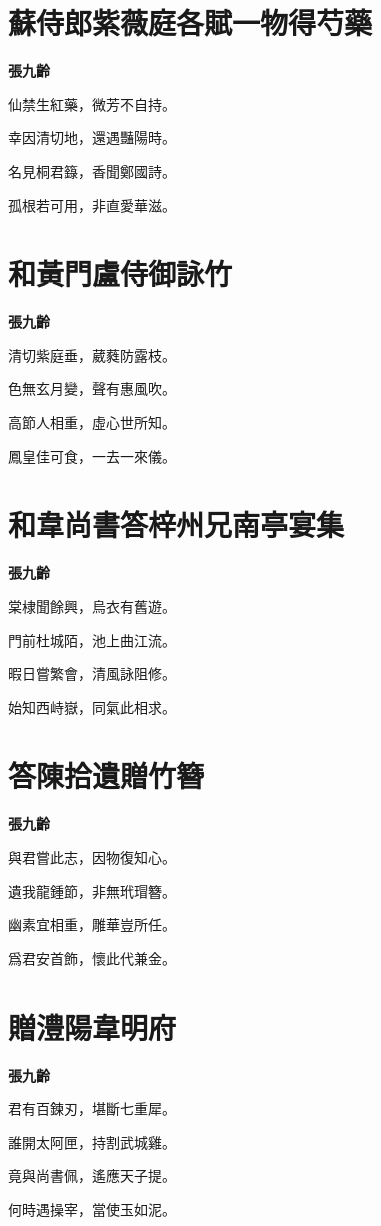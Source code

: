 \documentclass[12pt,a4paper]{ctexbook}
\begin{document}
\section{蘇侍郎紫薇庭各賦一物得芍藥}
\textbf{張九齡}\par\vspace{0.5em}
仙禁生紅藥，微芳不自持。\par
幸因清切地，還遇豔陽時。\par
名見桐君籙，香聞鄭國詩。\par
孤根若可用，非直愛華滋。\par

\section{和黃門盧侍御詠竹}
\textbf{張九齡}\par\vspace{0.5em}
清切紫庭垂，葳蕤防露枝。\par
色無玄月變，聲有惠風吹。\par
高節人相重，虛心世所知。\par
鳳皇佳可食，一去一來儀。\par

\section{和韋尚書答梓州兄南亭宴集}
\textbf{張九齡}\par\vspace{0.5em}
棠棣聞餘興，烏衣有舊遊。\par
門前杜城陌，池上曲江流。\par
暇日嘗繁會，清風詠阻修。\par
始知西峙嶽，同氣此相求。\par

\section{答陳拾遺贈竹簪}
\textbf{張九齡}\par\vspace{0.5em}
與君嘗此志，因物復知心。\par
遺我龍鍾節，非無玳瑁簪。\par
幽素宜相重，雕華豈所任。\par
爲君安首飾，懷此代兼金。\par

\section{贈澧陽韋明府}
\textbf{張九齡}\par\vspace{0.5em}
君有百鍊刃，堪斷七重犀。\par
誰開太阿匣，持割武城雞。\par
竟與尚書佩，遙應天子提。\par
何時遇操宰，當使玉如泥。\par
\end{document}
